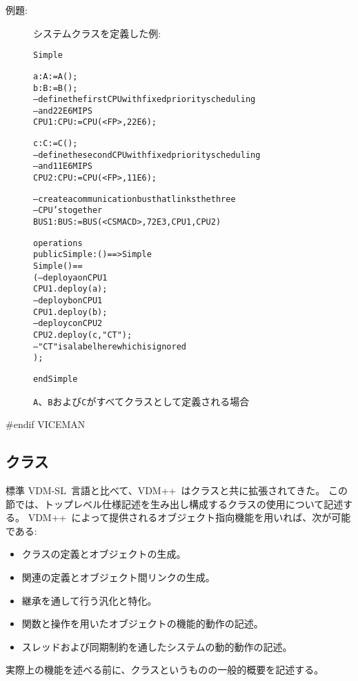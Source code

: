 \documentclass[\pformat,12pt]{jarticle}
\newcommand{\vdmsl}{VDM-SL}
\newcommand{\vdmpp}{VDM++}
\begin{document}
\begin{description}
\item[例題:] システムクラスを定義した例:
\begin{alltt}
 Simple

 a : A :=  A();
   b : B :=  B();
  -- define the first CPU with fixed priority scheduling 
  -- and 22E6 MIPS
  CPU1 : CPU :=  CPU (<FP>, 22E6);

   c : C :=  C();
  -- define the second CPU with fixed priority scheduling 
  -- and 11E6 MIPS
  CPU2 : CPU :=  CPU (<FP>, 11E6);

  -- create a communication bus that links the three 
  -- CPU's together
  BUS1 : BUS :=  BUS (<CSMACD>, 72E3, {CPU1, CPU2})

operations
  public Simple: () ==> Simple
  Simple () ==
    ( -- deploy a on CPU1
      CPU1.deploy(a);
      -- deploy b on CPU1
      CPU1.deploy(b);
      -- deploy c on CPU2
      CPU2.deploy(c,"CT"); 
      -- "CT" is a label here which is ignored
    );

end Simple
\end{alltt}

\noindent \texttt{A}、\texttt{B}および\texttt{C}がすべてクラスとして定義される場合
\end{description}
#endif VICEMAN

\subsection{クラス}
\label{sec:classdep}

標準 \vdmsl\ 言語と比べて、\vdmpp\ はクラスと共に拡張されてきた。
この節では、トップレベル仕様記述を生み出し構成するクラスの使用について記述する。
 \vdmpp\ によって提供されるオブジェクト指向機能を用いれば、次が可能である:

\begin{itemize}
\item クラスの定義とオブジェクトの生成。
\item 関連の定義とオブジェクト間リンクの生成。
\item 継承を通して行う汎化と特化。
\item 関数と操作を用いたオブジェクトの機能的動作の記述。
\item スレッドおよび同期制約を通したシステムの動的動作の記述。
\end{itemize}

実際上の機能を述べる前に、クラスというものの一般的概要を記述する。
\end{document}
